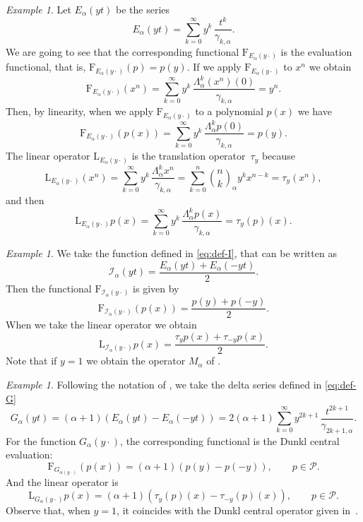 \documentclass[11pt]{article}
\theoremstyle{plain}
\theoremstyle{remark}
\newtheorem{example}[theorem]{Example}
\numberwithin{equation}{section} %
\newcommand{\Ea}{E_{\alpha}}
\newcommand{\La}{\Lambda_{\alpha}}
\newcommand{\binoma}[2]{\binom{#1}{#2}_{\!\alpha}}
\newcommand{\I}{\mathcal{I}}
\newcommand{\calP}{\mathcal{P}}
\newcommand{\FF}{\mathrm{F}}
\newcommand{\LL}{\mathrm{L}}
\begin{document}
\begin{example}
\label{ex:FEa}
Let $\Ea(yt)$ be the series
\[
\Ea(yt) = \sum_{k=0}^{\infty} {y^{k}} \, \frac{t^k}{\gamma_{k,\alpha}}.
\]
We are going to see that the corresponding functional $\FF_{\Ea(y\cdot)}$ is the evaluation functional, that is, $\FF_{\Ea(y\cdot)}(p) = p(y)$. If we apply $\FF_{\Ea(y\cdot)}$ to $x^n$ we obtain
\[
\FF_{\Ea(y\cdot)}(x^n) = \sum_{k=0}^{\infty} {y^k} \, \frac{\La^k(x^n)(0)}{\gamma_{k,\alpha}} = y^n.
\]
Then, by linearity, when we apply $\FF_{\Ea(y\cdot)}$ to a polynomial $p(x)$ we have
\[
\FF_{\Ea(y\cdot)}(p(x)) = \sum_{k=0}^{\infty} {y^k} \, \frac{\La^kp(0)}{\gamma_{k,\alpha}} = p(y).
\]
The linear operator $\LL_{\Ea(y\cdot)}$ is the translation operator~$\tau_y$ because
\[
\LL_{\Ea(y\cdot)}(x^n) = \sum_{k=0}^{\infty} {y^k}\, \frac{\La^kx^n}{\gamma_{k,\alpha}}
= \sum_{k=0}^n \binoma{n}{k} y^k x^{n-k} = \tau_y(x^n),
\]
and then
\[
\LL_{\Ea(y\cdot)}p(x) = \sum_{k=0}^{\infty} {y^k}\, \frac{\La^k p(x)}{\gamma_{k,\alpha}} 
= \tau_y(p)(x).
\]
\end{example}

\begin{example}
We take the function defined in \eqref{eq:def-I}, that can be written as 
\[
\I_{\alpha}(yt) = \frac{\Ea(yt)+\Ea(-yt)}{2}.
\]
Then the functional $\FF_{\I_{\alpha}(y\cdot)}$ is given by
\[
\FF_{\I_{\alpha}(y\cdot)}(p(x)) = \frac{p(y)+p(-y)}{2}.
\]
When we take the linear operator we obtain 
\begin{equation}
\label{eq:rel-euler}
\LL_{\I_{\alpha}(y\cdot)}p(x) = \frac{\tau_yp(x)+\tau_{-y}p(x)}{2}.
\end{equation}
Note that if $y = 1$ we obtain the operator $M_{\alpha}$ of \cite{GLMV}.
\end{example}

\begin{example}
\label{ex:Galpha}
Following the notation of \cite{ELMV}, we take the delta series defined in \eqref{eq:def-G}
\[
G_{\alpha}(yt) = (\alpha+1)(\Ea(yt)-\Ea(-yt)) 
= 2(\alpha+1) \sum_{k=0}^{\infty} {y^{2k+1}}\, \frac{t^{2k+1}}{\gamma_{2k+1,\alpha}}.
\]
For the function $G_{\alpha}(y\cdot)$, the corresponding functional is the Dunkl central evaluation:
\[
\FF_{G_{\alpha(y\cdot)}}(p(x)) = (\alpha+1)(p(y)-p(-y)),
\qquad p \in \calP.
\]
And the linear operator is 
\[
\LL_{G_{\alpha}(y\cdot)}p(x) = (\alpha+1)(\tau_y(p)(x)-\tau_{-y}(p)(x)),
\qquad p \in \calP.
\]
Observe that, when $y=1$, it coincides with the Dunkl central operator given in~\cite{ELMV}.
\end{example}
\end{document}
